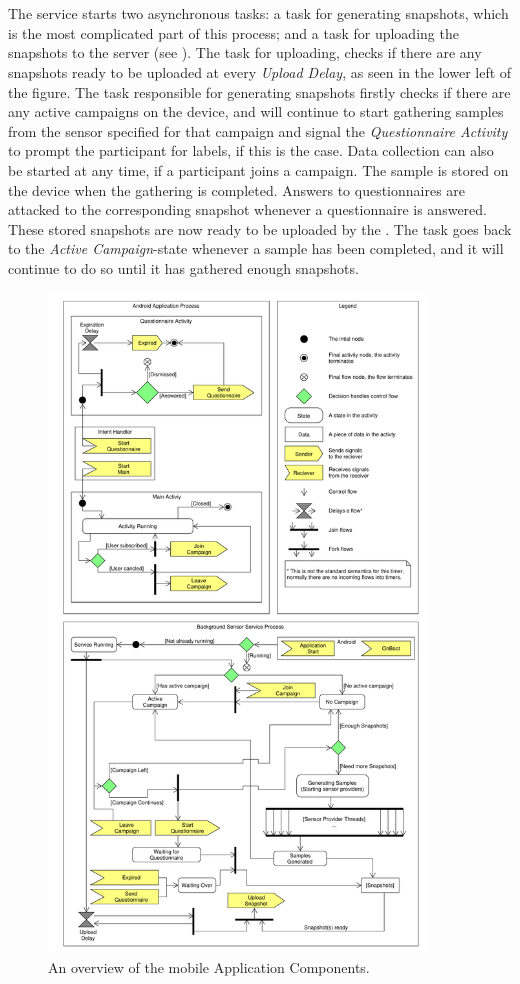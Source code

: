 \\\\
The service starts two asynchronous tasks: a task for generating snapshots, which is the most complicated part of this process; and a task for uploading the snapshots to the server (see ). The task for uploading, checks if there are any snapshots ready to be uploaded at every \emph{Upload Delay}, as seen in the lower left of the figure. The task responsible for generating snapshots firstly checks if there are any active campaigns on the device, and will continue to start gathering samples from the sensor specified for that campaign and signal the \emph{Questionnaire Activity} to prompt the participant for labels, if this is the case. Data collection can also be started at any time, if a participant joins a campaign. The sample is stored on the device when the gathering is completed. Answers to questionnaires are attacked to the corresponding snapshot whenever a questionnaire is answered. These stored snapshots are now ready to be uploaded by the . The task goes back to the \emph{Active Campaign}-state whenever a sample has been completed, and it will continue to do so until it has gathered enough snapshots.

\begin{figure}[!htbp]
    \centering
    \includegraphics[width=0.9\textwidth]{graphic/backgroundsensorservice/lifecyclestuff}
    \caption{An overview of the mobile Application Components.}
    \label{fig:system_currency_and_lifecycle}
\end{figure}
\FloatBarrier